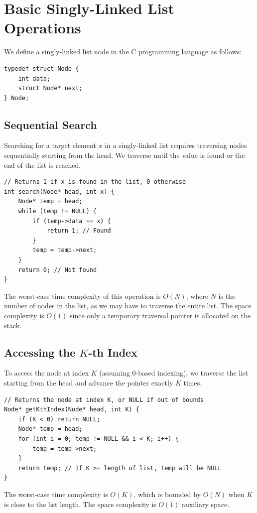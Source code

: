 \documentclass[10pt,journal,compsoc]{IEEEtran}
\begin{document}
\section{Basic Singly-Linked List Operations}
We define a singly-linked list node in the C programming language as follows:

\begin{verbatim}
typedef struct Node {
    int data;
    struct Node* next;
} Node;
\end{verbatim}

\subsection{Sequential Search}
Searching for a target element $x$ in a singly-linked list requires traversing nodes sequentially starting from the head. We traverse until the value is found or the end of the list is reached.

\begin{verbatim}
// Returns 1 if x is found in the list, 0 otherwise
int search(Node* head, int x) {
    Node* temp = head;
    while (temp != NULL) {
        if (temp->data == x) {
            return 1; // Found
        }
        temp = temp->next;
    }
    return 0; // Not found
}
\end{verbatim}

The worst-case time complexity of this operation is $O(N)$, where $N$ is the number of nodes in the list, as we may have to traverse the entire list. The space complexity is $O(1)$ since only a temporary traversal pointer is allocated on the stack.

\subsection{Accessing the $K$-th Index}
To access the node at index $K$ (assuming 0-based indexing), we traverse the list starting from the head and advance the pointer exactly $K$ times.

\begin{verbatim}
// Returns the node at index K, or NULL if out of bounds
Node* getKthIndex(Node* head, int K) {
    if (K < 0) return NULL;
    Node* temp = head;
    for (int i = 0; temp != NULL && i < K; i++) {
        temp = temp->next;
    }
    return temp; // If K >= length of list, temp will be NULL
}
\end{verbatim}

The worst-case time complexity is $O(K)$, which is bounded by $O(N)$ when $K$ is close to the list length. The space complexity is $O(1)$ auxiliary space.
\end{document}
